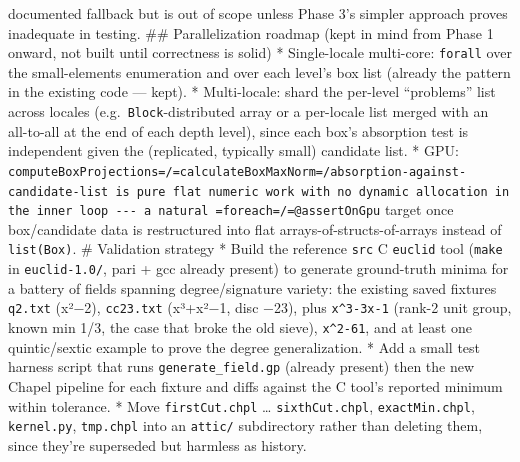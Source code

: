 \documentclass[11pt]{article}
\begin{document}
documented fallback but is out of scope unless Phase 3's simpler
approach proves inadequate in testing. \#\# Parallelization roadmap (kept
in mind from Phase 1 onward, not built until correctness is solid) *
Single-locale multi-core: \texttt{forall} over the small-elements enumeration
and over each level's box list (already the pattern in the existing code
--- kept). * Multi-locale: shard the per-level “problems” list across
locales (e.g. \texttt{Block}-distributed array or a per-locale list merged with
an all-to-all at the end of each depth level), since each box's
absorption test is independent given the (replicated, typically small)
candidate list. * GPU:
\texttt{computeBoxProjections=/=calculateBoxMaxNorm=/absorption-against-candidate-list
is pure flat numeric work with no dynamic allocation in the inner loop
-{}-{}- a natural =foreach=/=@assertOnGpu} target once box/candidate data is
restructured into flat arrays-of-structs-of-arrays instead of
\texttt{list(Box)}. \# Validation strategy * Build the reference \texttt{src} C
\texttt{euclid} tool (\texttt{make} in \texttt{euclid-1.0/}, pari + gcc already present) to
generate ground-truth minima for a battery of fields spanning
degree/signature variety: the existing saved fixtures \texttt{q2.txt} (x²−2),
\texttt{cc23.txt} (x³+x²−1, disc −23), plus \texttt{x\textasciicircum{}3-3x-1} (rank-2 unit group,
known min 1/3, the case that broke the old sieve), \texttt{x\textasciicircum{}2-61}, and at
least one quintic/sextic example to prove the degree generalization. *
Add a small test harness script that runs \texttt{generate\_field.gp} (already
present) then the new Chapel pipeline for each fixture and diffs against
the C tool's reported minimum within tolerance. * Move \texttt{firstCut.chpl}
\ldots{} \texttt{sixthCut.chpl}, \texttt{exactMin.chpl}, \texttt{kernel.py}, \texttt{tmp.chpl} into an
\texttt{attic/} subdirectory rather than deleting them, since they're
superseded but harmless as history.
\end{document}
